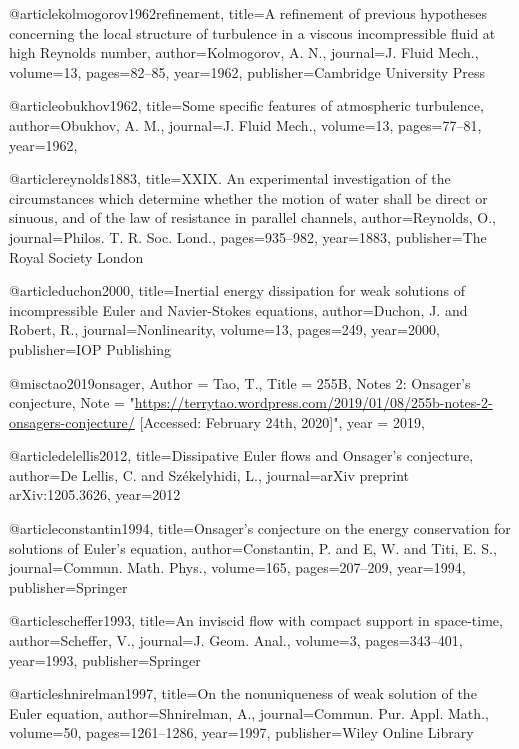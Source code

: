 @article{kolmogorov1962refinement,
  title={{A refinement of previous hypotheses concerning the local structure of turbulence in a viscous incompressible fluid at high Reynolds number}},
  author={Kolmogorov, A. N.},
  journal={J. Fluid Mech.},
  volume={13},
  pages={82--85},
  year={1962},
  publisher={Cambridge University Press}
}

@article{obukhov1962,
  title={{Some specific features of atmospheric turbulence}},
  author={Obukhov, A. M.},
  journal={J. Fluid Mech.},
  volume={13},
  pages={77--81},
  year={1962},
}

@article{reynolds1883,
  title={{XXIX. An experimental investigation of the circumstances which determine whether the motion of water shall be direct or sinuous, and of the law of resistance in parallel channels}},
  author={Reynolds, O.},
  journal={Philos. T. R. Soc. Lond.},
  pages={935--982},
  year={1883},
  publisher={The Royal Society London}
}

@article{duchon2000,
  title={{Inertial energy dissipation for weak solutions of incompressible Euler and Navier-Stokes equations}},
  author={Duchon, J. and Robert, R.},
  journal={Nonlinearity},
  volume={13},
  pages={249},
  year={2000},
  publisher={IOP Publishing}
}

@misc{tao2019onsager,
    Author = {Tao, T.},
    Title  = {{255B, Notes 2: Onsager’s conjecture}},
    Note   = "\url{https://terrytao.wordpress.com/2019/01/08/255b-notes-2-onsagers-conjecture/} [Accessed: February 24th, 2020]",
    year = 2019,
  }

@article{delellis2012,
  title={{Dissipative Euler flows and Onsager's conjecture}},
  author={De Lellis, C. and Sz{\'e}kelyhidi, L.},
  journal={arXiv preprint arXiv:1205.3626},
  year={2012}
}

@article{constantin1994,
  title={{Onsager's conjecture on the energy conservation for solutions of Euler's equation}},
  author={Constantin, P. and E, W. and Titi, E. S.},
  journal={Commun. Math. Phys.},
  volume={165},
  pages={207--209},
  year={1994},
  publisher={Springer}
}

@article{scheffer1993,
  title={{An inviscid flow with compact support in space-time}},
  author={Scheffer, V.},
  journal={J. Geom. Anal.},
  volume={3},
  pages={343--401},
  year={1993},
  publisher={Springer}
}

@article{shnirelman1997,
  title={{On the nonuniqueness of weak solution of the Euler equation}},
  author={Shnirelman, A.},
  journal={Commun. Pur. Appl. Math.},
  volume={50},
  pages={1261--1286},
  year={1997},
  publisher={Wiley Online Library}
}


